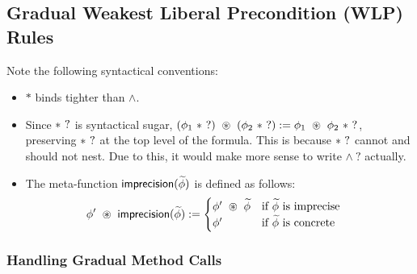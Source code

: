 
\newpage
\subsection{Gradual Weakest Liberal Precondition (WLP) Rules}



\noindent
Note the following syntactical conventions:
\begin{itemize}
  \item
    $\ast$ binds tighter than $\land$.

  \item
    Since $\ast \ ?$ is syntactical sugar, $(\phi_1 \ \imprecise) \ \circast \ (\phi_2 \ \imprecise) := \phi_1 \ \circast \ \phi_2 \ \imprecise$, preserving $\ast \ ?$ at the top level of the formula. This is because $\ast \ ?$ cannot and should not nest. Due to this, it would make more sense to write $\land \ ?$ actually.

  \item
    The meta-function $\textsf{imprecision}(\widetilde{\phi})$ is defined as follows:
    \begin{align*}
      \phi^\prime \ \circledast \ \textsf{imprecision}(\widetilde{\phi}) &:=
        \begin{cases}
          \phi^\prime \ \circledast \ \widetilde{\phi} & \text{if $\widetilde{\phi}$ is imprecise} \\
          \phi^\prime                    & \text{if $\widetilde{\phi}$ is concrete}
        \end{cases}
    \end{align*}
\end{itemize}


\newpage
\subsubsection{Handling Gradual Method Calls}


